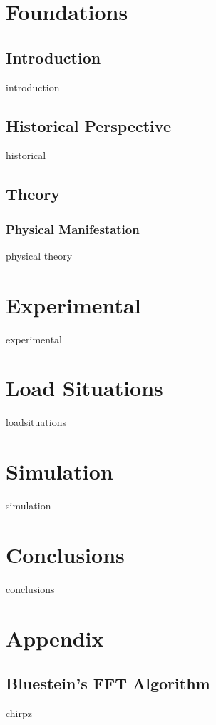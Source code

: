 \documentclass[12pt,a4paper,titlepage,onecolumn]{report}
\begin{document}
\chapter{Foundations}\label{ch:qcmfoundations}
\section{Introduction}
{introduction}
\section{Historical Perspective}
{historical}
\section{Theory}
\subsection{Physical Manifestation}
{physical}
{theory}
\chapter{Experimental}\label{ch:qcmexperimental}
{experimental}
\chapter{Load Situations}\label{ch:qcmloadsituations}
{loadsituations}
\chapter{Simulation}\label{ch:qcmsimulation}
{simulation}
\chapter{Conclusions}\label{ch:qcmconclusions}
{conclusions}

\appendix
\chapter{Appendix}
\section{Bluestein's FFT Algorithm}
{chirpz}
\end{document}

